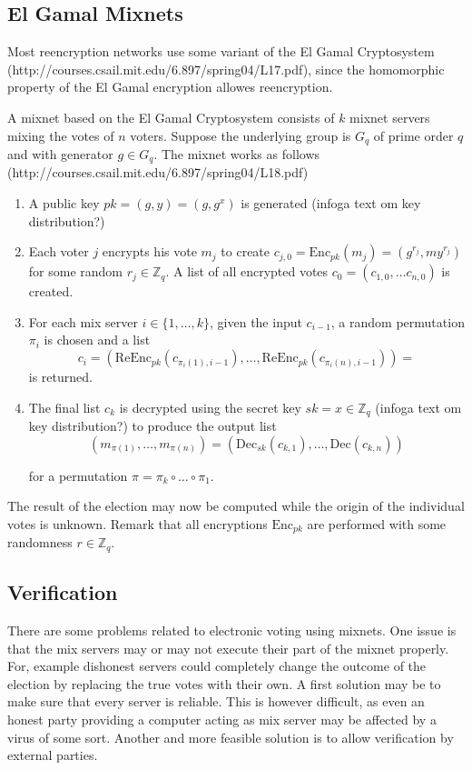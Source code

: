 \subsection{El Gamal Mixnets}

Most reencryption networks use some variant of the El Gamal
Cryptosystem (http://courses.csail.mit.edu/6.897/spring04/L17.pdf),
since the homomorphic property of the El Gamal encryption allowes
reencryption.

A mixnet based on the El Gamal Cryptosystem consists of $k$ mixnet
servers mixing the votes of $n$ voters. Suppose the underlying group
is $G_q$ of prime order $q$ and with generator $g \in G_q$. The mixnet
works as follows \\
(http://courses.csail.mit.edu/6.897/spring04/L18.pdf)

\begin{enumerate}
\item A public key $pk = (g,y) = (g, g^x)$ is generated (infoga text om key distribution?)
\item Each voter $j$ encrypts his vote $m_j$ to create $c_{j,0} =
  \mathrm{Enc}_{pk}(m_j) = (g^{r_j},my^{r_j})$ for some random $r_j
  \in \mathbb{Z}_q$.  A list of all encrypted votes $c_0 = \left(
  c_{1,0}, \hdots c_{n,0}\right)$ is created.
\item For each mix server $i \in \{1,\hdots, k\}$, given the input
  $c_{i-1}$, a random permutation $\pi _i$ is chosen and a list 
  $$ 
  c_i =\left(\mathrm{ReEnc}_{pk}(c_{\pi_i(1),i-1}), \hdots,
  \mathrm{ReEnc}_{pk}(c_{\pi_i(n), i-1})\right) =
  $$
  is returned.
\item The final list $c_k$ is decrypted using the secret key $sk = x
  \in \mathbb{Z}_q$ (infoga text om key distribution?) to produce
  the output list
 $$ 
  (m_{\pi (1)}, \hdots , m_{\pi (n)}) =
  \left(\mathrm{Dec}_{sk}(c_{k,1}), \hdots, \mathrm{Dec}(c_{k,n})\right)
  $$
  
  for a permutation $\pi = \pi_k \circ \hdots \circ \pi_1$.
\end{enumerate}

The result of the election may now be computed while the origin of the
individual votes is unknown. Remark that all encryptions
$\mathrm{Enc}_{pk}$ are performed with some randomness $r \in
\mathbb{Z}_q$.

\subsection{Verification}
There are some problems related to electronic voting using
mixnets. One issue is that the mix servers may or may not execute
their part of the mixnet properly. For, example dishonest servers
could completely change the outcome of the election by replacing the
true votes with their own. A first solution may be to make sure that
every server is reliable. This is however difficult, as even an honest
party providing a computer acting as mix server may be affected by a
virus of some sort. Another and more feasible solution is to allow
verification by external parties.

